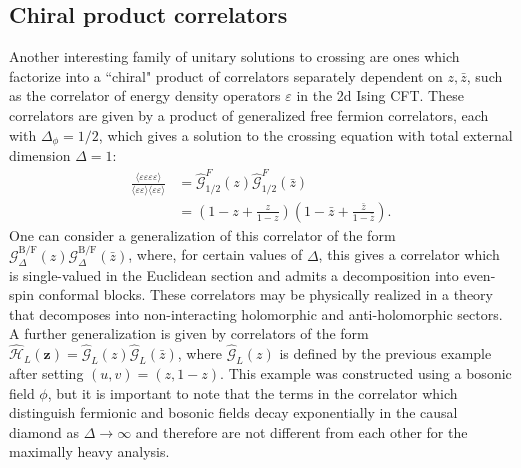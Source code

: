 \documentclass[a4paper,11pt]{article}
\theoremstyle{plain}
\theoremstyle{definition}
\theoremstyle{remark}
\newcommand{\bs}[1]{\boldsymbol{#1}}
\newcommand{\ba}{\begin{equation} \begin{aligned}}
\newcommand{\ea}{\end{aligned} \end{equation}}
\newcommand{\Df}{\Delta_\phi}
\newcommand{\De}{\Delta}
\begin{document}
\subsection{Chiral product correlators}
\label{chiralproduct}

Another interesting family of unitary solutions to crossing are ones which factorize into a ``chiral" product of correlators separately dependent on $z,\bar{z}$, such as the correlator of energy density operators $\varepsilon$ in the 2d Ising CFT. These correlators are given by a product of generalized free fermion correlators, each with $\Df = 1/2$, which gives a solution to the crossing equation with total external dimension $\De = 1$:
\ba
\frac{\langle \varepsilon\varepsilon\varepsilon\varepsilon\rangle }{\langle \varepsilon\varepsilon\rangle\langle\varepsilon\varepsilon\rangle} &= \widehat{\mathcal{G}}^F_{1/2}(z) \widehat{\mathcal{G}}^F_{1/2}(\bar{z})\\
&= \left(1 - z + \frac{z}{1-z}\right)\left(1 - \bar{z} + \frac{\bar{z}}{1-\bar{z}}\right).
\ea
One can consider a generalization of this correlator of the form $\mathcal{G}_\De^{\mathrm{B/F}}(z)\mathcal{G}_\De^{\mathrm{B/F}}(\bar{z})$, where, for certain values of $\De$, this gives a correlator which is single-valued in the Euclidean section and admits a decomposition into even-spin conformal blocks. These correlators may be physically realized in a theory that decomposes into non-interacting holomorphic and anti-holomorphic sectors. A further generalization is given by correlators of the form $\widehat{\mathcal{H}}_L(\bs{z}) = \widehat{\mathcal{G}}_L(z)\widehat{\mathcal{G}}_L(\bar{z})$, where $\widehat{\mathcal{G}}_L(z)$ is defined by the previous example after setting $(u,v) =(z,1-z)$. This example was constructed using a bosonic field $\phi$, but it is important to note that the terms in the correlator which distinguish fermionic and bosonic fields decay exponentially in the causal diamond as $\De\to\infty$ and therefore are not different from each other for the maximally heavy analysis. 
\end{document}
